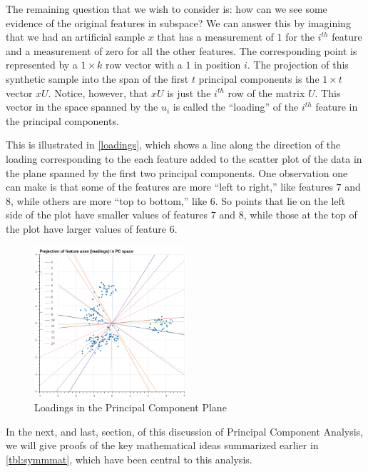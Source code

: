 \documentclass[
]{article}
\begin{document}
The remaining question that we wish to consider is: how can we see some
evidence of the original features in subspace? We can answer this by
imagining that we had an artificial sample \(x\) that has a measurement
of \(1\) for the \(i^{th}\) feature and a measurement of zero for all
the other features. The corresponding point is represented by a
\(1\times k\) row vector with a \(1\) in position \(i\). The projection
of this synthetic sample into the span of the first \(t\) principal
components is the \(1\times t\) vector \(xU\). Notice, however, that
\(xU\) is just the \(i^{th}\) row of the matrix \(U\). This vector in
the space spanned by the \(u_{i}\) is called the ``loading'' of the
\(i^{th}\) feature in the principal components.

This is illustrated in \cref{loadings}, which shows a line along the
direction of the loading corresponding to the each feature added to the
scatter plot of the data in the plane spanned by the first two principal
components. One observation one can make is that some of the features
are more ``left to right,'' like features \(7\) and \(8\), while others
are more ``top to bottom,'' like \(6\). So points that lie on the left
side of the plot have smaller values of features \(7\) and \(8\), while
those at the top of the plot have larger values of feature \(6\).

\begin{figure}
\hypertarget{fig:loadings}{%
\centering
\includegraphics[width=0.5\textwidth,height=\textheight]{../img/loading.png}
\caption{Loadings in the Principal Component Plane}\label{fig:loadings}
}
\end{figure}

In the next, and last, section, of this discussion of Principal
Component Analysis, we will give proofs of the key mathematical ideas
summarized earlier in \cref{tbl:symmmat}, which have been central to
this analysis.
\end{document}
